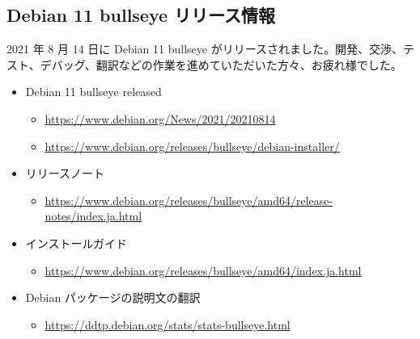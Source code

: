\documentclass[mingoth,a4paper]{jsarticle}
\begin{document}
%
%
%
% 





\subsection{Debian 11 bullseye リリース情報}

2021 年 8 月 14 日に Debian 11 bullseye がリリースされました。開発、交渉、テスト、デバッグ、翻訳などの作業を進めていただいた方々、お疲れ様でした。

\begin{itemize}
\item Debian 11 bullseye released
  \begin{itemize}
  \item \url{https://www.debian.org/News/2021/20210814}
  \item \url{https://www.debian.org/releases/bullseye/debian-installer/}
  \end{itemize}
\item リリースノート
  \begin{itemize}
  \item \url{https://www.debian.org/releases/bullseye/amd64/release-notes/index.ja.html}
  \end{itemize}
\item インストールガイド
  \begin{itemize}
  \item \url{https://www.debian.org/releases/bullseye/amd64/index.ja.html}
  \end{itemize}
\item Debian パッケージの説明文の翻訳
  \begin{itemize}
  \item \url{https://ddtp.debian.org/stats/stats-bullseye.html}
  \end{itemize}
\end{itemize}
\end{document}
